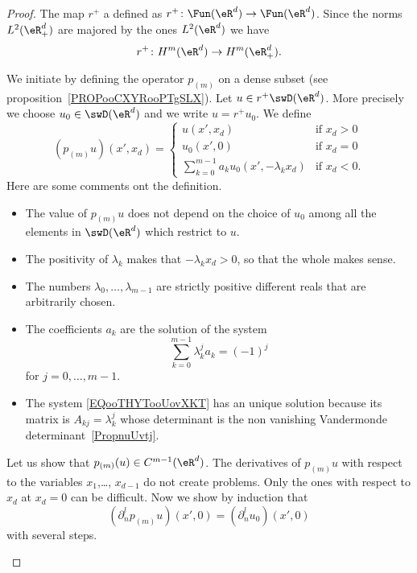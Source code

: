 \begin{proof}
	The map \( r^+\) a defined as \( r^+\colon \Fun(\eR^d)\to \Fun(\eR^d)\). Since the norms \( L^2(\eR^d_+)\) are majored by the ones \( L^2(\eR^d)\) we have
	\begin{equation}
		r^+\colon H^m(\eR^d)\to H^m(\eR^d_+).
	\end{equation}

	We initiate by defining the operator \( p_{(m)}\) on a dense subset (see proposition~\ref{PROPooCXYRooPTgSLX}).  Let \( u\in r^+\swD(\eR^d)\). More precisely we choose \( u_0\in\swD(\eR^d)\) and we write \( u=r^+u_0\). We define
	\begin{equation}
		(p_{(m)}u)(x',x_d)=\begin{cases}
			u(x',x_d)                                & \text{if } x_d> 0 \\
			u_0(x',0)                                & \text{if }  x_d=0 \\
			\sum_{k=0}^{m-1}a_ku_0(x',-\lambda_kx_d) & \text{if } x_d<0.
		\end{cases}
	\end{equation}
	Here are some comments ont the definition.
	\begin{itemize}
		\item
		      The value of \( p_{(m)}u\) does not depend on the choice of \( u_0\) among all the elements in \( \swD(\eR^d)\) which restrict to \( u\).
		\item
		      The positivity of \( \lambda_k\) makes that \( -\lambda_kx_d>0\), so that the whole makes sense.
		\item
		      The numbers \( \lambda_0,\ldots,\lambda_{m-1}\) are strictly positive different reals that are arbitrarily chosen.
		\item
		      The coefficients \( a_k\) are the solution of the system
		      \begin{equation}        \label{EQooTHYTooUovXKT}
			      \sum_{k=0}^{m-1}\lambda_k^ja_k=(-1)^j
		      \end{equation}
		      for \( j=0,\ldots, m-1\).
		\item
		      The system \eqref{EQooTHYTooUovXKT} has an unique solution because its matrix is \( A_{kj}=\lambda_k^j\) whose determinant is the non vanishing Vandermonde determinant~\ref{PropnuUvtj}.
	\end{itemize}

	Let us show that \( p_{(m)}(u)\in C^{m-1}(\eR^d)\). The derivatives of \( p_{(m)}u\) with respect to the variables \( x_1\),\ldots, \( x_{d-1}\) do not create problems. Only the ones with respect to \( x_d\) at \( x_d=0\) can be difficult. Now we show by induction that
	\begin{equation}
		(\partial_n^lp_{(m)}u)(x',0)=(\partial_n^lu_0)(x',0)
	\end{equation}
	with several steps.
	\begin{subproof}
		\spitem[First: \( (\partial_np_{(m)}u)(x',0)=(\partial_nu_0)(x',0)\)]


\end{subproof}
\end{proof}
